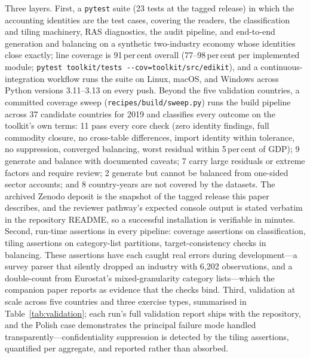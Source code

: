 \documentclass[11pt,a4paper]{article}
\begin{document}
Three layers. First, a \texttt{pytest} suite (23 tests at the tagged
release) in which the accounting identities are the test cases, covering
the readers, the classification and tiling machinery, RAS diagnostics,
the audit pipeline, and end-to-end generation and balancing on a
synthetic two-industry economy whose identities close exactly; line
coverage is 91\,per\,cent overall (77--98\,per\,cent per implemented
module; \texttt{pytest toolkit/tests -{}-cov=toolkit/src/edikit}), and
a continuous-integration workflow runs the suite on Linux, macOS, and
Windows across Python versions 3.11--3.13 on every push. Beyond the five
validation countries, a committed coverage sweep
(\texttt{recipes/build/sweep.py}) runs the build pipeline across 37
candidate countries for 2019 and classifies every outcome on the
toolkit's own terms: 11 pass every core check (zero identity findings,
full commodity closure, no cross-table differences, import identity
within tolerance, no suppression, converged balancing, worst residual
within 5\,per\,cent of GDP); 9 generate and balance with documented
caveats; 7 carry large residuals or extreme factors and require review;
2 generate but cannot be balanced from one-sided sector accounts; and 8
country-years are not covered by the datasets. The archived Zenodo deposit is the snapshot of
the tagged release this paper describes, and the reviewer pathway's
expected console output is stated verbatim in the repository README, so
a successful installation is verifiable in minutes. Second, run-time assertions in every pipeline:
coverage assertions on classification, tiling assertions on
category-list partitions, target-consistency checks in balancing. These
assertions have each caught real errors during development---a survey
parser that silently dropped an industry with 6{,}202 observations, and
a double-count from Eurostat's mixed-granularity category lists---which
the companion paper reports as evidence that the checks bind. Third,
validation at scale across five countries and three exercise types,
summarised in Table~\ref{tab:validation}; each run's full validation
report ships with the repository, and the Polish case demonstrates the
principal failure mode handled transparently---confidentiality
suppression is detected by the tiling assertions, quantified per
aggregate, and reported rather than absorbed.
\end{document}
